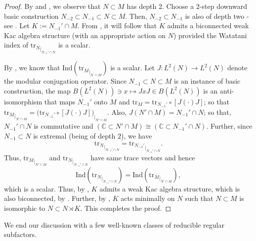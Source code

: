 \documentclass{amsart}
\theoremstyle{definition}
\theoremstyle{theorem}
\newcommand{\rar}{\rightarrow}
\newcommand{\C}{\mathbb{C}}
\newcommand{\tr}{\mathrm{tr}}
\begin{document}
\begin{proof}
 By  and , we observe that
 $N \subset M$ has depth $2$.  Choose a $2$-step downward basic
 construction $N_{-2}\subset N_{-1}\subset N\subset M$.  Then,
 $N_{-2}\subset N_{-1}$ is also of depth two - see
 . Let $K:=N_{-1}'\cap M$. From \cite{NV1}, it will
 follow that $K$ admits a biconnected weak Kac algebra structure (with
 an appropriate action on $N$) provided the Watatani index of
 ${\tr_N}_{|_{N_{-1}'\cap N}}$ is a scalar.

By , we know that
$\text{Ind}({\tr_M}_{|_{N^{\prime}\cap M}})$ is a scalar.  Let $J:
L^2(N) \rar L^2(N)$ denote the modular conjugation operator. Since
$N_{-1} \subset N \subset M$ is an instance of basic construction, the
map $B(L^2(N)) \ni x \mapsto JxJ \in B(L^2(N))$ is an anti-isomorphism
that maps $N_{-1}'$ onto $M$ and $\tr_M = \tr_{N_{-1}'}\circ [J(\cdot)
  J]$; so that \( {\tr_M}_{|_{N'\cap M}} = {\big({\tr_{N_{-1}'}}\circ
  [J (\cdot) J]\big)}_{|_{N'\cap M}}\). Also, $ 
J(N'\cap M) = N_{-1}'\cap N$; so that, $N_{-1}'\cap N$ is commutative and $(\C \subset N'\cap
M) \cong (\C \subset N_{-1}'\cap N)$. Further, since $N_{-1}\subset N$
is extremal (being of depth $2$), we have
\[
{\tr_N}_{|_{N_{-1}'\cap N }} = {\tr_{N_{-1}'}}_{|_{N_{-1}'\cap N }}.
\]
Thus, ${\tr_M}_{|_{N'\cap M}}$ and ${\tr_N}_{|_{N_{-1}'\cap N }}$ have
same trace vectors and hence
\[
 \mathrm{Ind}({\tr_N}_{|_{N_{-1}'\cap N}}) =  \text{Ind}({\tr_M}_{|_{N^{\prime}\cap M}}) ,
\]
which is a scalar. Thus, by \cite[Corollary 4.7 and Theorem
  4.17]{NV1}, $K$ admits a weak Kac algebra structure, which is also
biconnected, by \cite[Remark 5.8 (ii)]{NV1}. Further, by
\cite[Propositions 6.1 and 6.3, and Remark 6.4 (i)]{NV1}, $K$ acts
minimally on $N$ such that $N \subset M$ is isomorphic to $N \subset N
\rtimes K$. This completes the proof. 
\end{proof}
We end our discussion with a few well-known classes of reducible
regular subfactors.
\end{document}
